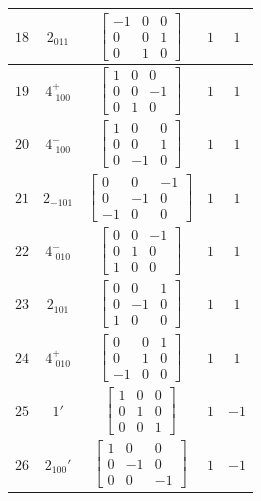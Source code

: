 \documentclass[fleqn,8pt]{jsarticle}
\begin{document}
\begin{longtable}{ccccc}
$ 18 $ & $ 2{}_{011} $ & $ \begin{bmatrix} -1 & 0 & 0 \\ 0 & 0 & 1 \\ 0 & 1 & 0 \end{bmatrix} $ & $ 1 $ & $ 1 $ \\ \hline
$ 19 $ & $ 4^{+}_{\,\,100} $ & $ \begin{bmatrix} 1 & 0 & 0 \\ 0 & 0 & -1 \\ 0 & 1 & 0 \end{bmatrix} $ & $ 1 $ & $ 1 $ \\ \hline
$ 20 $ & $ 4^{-}_{\,\,100} $ & $ \begin{bmatrix} 1 & 0 & 0 \\ 0 & 0 & 1 \\ 0 & -1 & 0 \end{bmatrix} $ & $ 1 $ & $ 1 $ \\ \hline
$ 21 $ & $ 2{}_{-101} $ & $ \begin{bmatrix} 0 & 0 & -1 \\ 0 & -1 & 0 \\ -1 & 0 & 0 \end{bmatrix} $ & $ 1 $ & $ 1 $ \\ \hline
$ 22 $ & $ 4^{-}_{\,\,010} $ & $ \begin{bmatrix} 0 & 0 & -1 \\ 0 & 1 & 0 \\ 1 & 0 & 0 \end{bmatrix} $ & $ 1 $ & $ 1 $ \\ \hline
$ 23 $ & $ 2{}_{101} $ & $ \begin{bmatrix} 0 & 0 & 1 \\ 0 & -1 & 0 \\ 1 & 0 & 0 \end{bmatrix} $ & $ 1 $ & $ 1 $ \\ \hline
$ 24 $ & $ 4^{+}_{\,\,010} $ & $ \begin{bmatrix} 0 & 0 & 1 \\ 0 & 1 & 0 \\ -1 & 0 & 0 \end{bmatrix} $ & $ 1 $ & $ 1 $ \\ \hline
$ 25 $ & $ 1{}' $ & $ \begin{bmatrix} 1 & 0 & 0 \\ 0 & 1 & 0 \\ 0 & 0 & 1 \end{bmatrix} $ & $ 1 $ & $ -1 $ \\ \hline
$ 26 $ & $ 2{}_{100}{}' $ & $ \begin{bmatrix} 1 & 0 & 0 \\ 0 & -1 & 0 \\ 0 & 0 & -1 \end{bmatrix} $ & $ 1 $ & $ -1 $ \\ \hline

\end{longtable}
\end{document}
